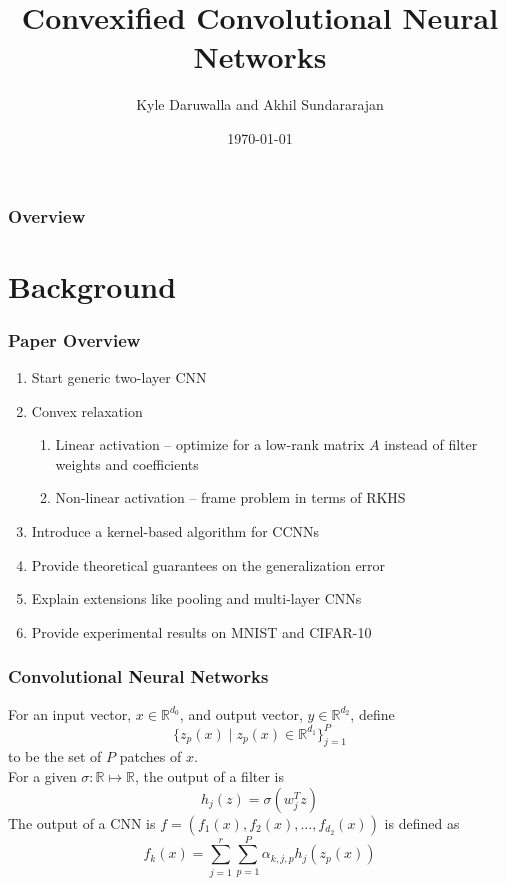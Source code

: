 \documentclass[hyperref={colorlinks}]{beamer}
\title[ECE 901 Paper Presentation]{Convexified Convolutional Neural Networks} %
\author{Kyle Daruwalla and Akhil Sundararajan}
\institute[UW-Madison]{ECE 901 Fall 2016}
\date{\today}
\newcommand{\set}[1]{\mathbb{#1}}
\begin{document}
\begin{frame}
	\titlepage
\end{frame}

\begin{frame}
	\frametitle{Overview}
	\tableofcontents
\end{frame}


\section{Background}
\begin{frame}
	\frametitle{Paper Overview}
	\begin{enumerate}
		\item Start generic two-layer CNN
		\item Convex relaxation
		\begin{enumerate}
			\item Linear activation -- optimize for a low-rank matrix $A$ instead of filter weights and coefficients
			\item Non-linear activation -- frame problem in terms of RKHS
		\end{enumerate}
		\item Introduce a kernel-based algorithm for CCNNs
		\item Provide theoretical guarantees on the generalization error
		\item Explain extensions like pooling and multi-layer CNNs
		\item Provide experimental results on MNIST and CIFAR-10
	\end{enumerate}
\end{frame}

\begin{frame}
	\frametitle{Convolutional Neural Networks}
	For an input vector, $x \in \set{R}^{d_0}$, and output vector, $y \in \set{R}^{d_2}$, define
	$$\{z_p(x) \mid z_p(x) \in \set{R}^{d_1}\}_{j = 1}^P$$
	to be the set of $P$ patches of $x$. \\
	For a given $\sigma: \set{R} \mapsto \set{R}$, the output of a filter is
	$$h_j(z) = \sigma(w_j^T z)$$
	The output of a CNN is $f = (f_1(x), f_2(x), \ldots, f_{d_2}(x))$ is defined as
	\begin{equation}
		f_k(x) = \sum_{j = 1}^r \sum_{p = 1}^P \alpha_{k, j, p} h_j(z_p(x))
		\label{eq:cnn-output}
	\end{equation}
\end{frame}
\end{document}
